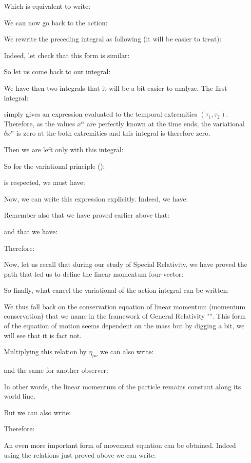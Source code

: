 	Which is equivalent to write:
	
	We can now go back to the action:
	
	We rewrite the preceding integral as following (it will be easier to treat):
	
	Indeed, let check that this form is similar:
	
	So let us come back to our integral:
	
	We have then two integrals that it will be a bit easier to analyze. The first integral:
	
	simply gives an expression evaluated to the temporal extremities $(\tau_1,\tau_2)$. Therefore, as the values  $x^\alpha$ are perfectly known at the time ends, the variational $\delta x^\alpha$ is zero at the both extremities and this integral is therefore zero.
	
	Then we are left only with this integral:
	
	So for the variational principle ():
	 
	is respected, we must have:
	
	Now, we can write this expression explicitly. Indeed, we have:
	 
	Remember also that we have proved earlier above that:
	
	and that we have:
	
	Therefore:
	
	Now, let us recall that during our study of Special Relativity, we have proved the path that led us to define the linear momentum four-vector:
	
	So finally, what cancel the variational of the action integral can be written:
	
	We thus fall back on the conservation equation of linear momentum (momentum conservation) that we name in the framework of General Relativity "". This form of the equation of motion seems dependent on the mass but by digging a bit, we will see that it is fact not.
	
	Multiplying this relation by $\eta_{\mu\nu}$ we can also write:
	
	and the same for another observer:
	
	In other words, the linear momentum of the particle remains constant along its world line.

	But we can also write:
	
	Therefore:
	
	An even more important form of movement equation can be obtained. Indeed using the relations just proved above we can write:
	

